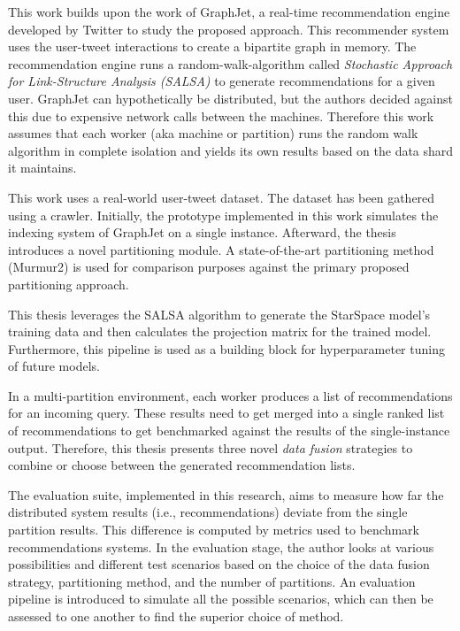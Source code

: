 This work builds upon the work of GraphJet, a real-time recommendation engine developed by Twitter to study the proposed approach. This recommender system uses the user-tweet interactions to create a bipartite graph in memory. The recommendation engine runs a random-walk-algorithm called \emph{Stochastic Approach for Link-Structure Analysis (SALSA)} to generate recommendations for a given user. GraphJet can hypothetically be distributed, but the authors decided against this due to expensive network calls between the machines. Therefore this work assumes that each worker (aka machine or partition) runs the random walk algorithm in complete isolation and yields its own results based on the data shard it maintains. 


This work uses a real-world user-tweet dataset. The dataset has been gathered using a crawler. Initially, the prototype implemented in this work simulates the indexing system of GraphJet on a single instance. Afterward, the thesis introduces a novel partitioning module. A state-of-the-art partitioning method (Murmur2) is used for comparison purposes against the primary proposed partitioning approach.


This thesis leverages the SALSA algorithm to generate the StarSpace model's training data and then calculates the projection matrix for the trained model. Furthermore, this pipeline is used as a building block for hyperparameter tuning of future models. 


In a multi-partition environment, each worker produces a list of recommendations for an incoming query. These results need to get merged into a single ranked list of recommendations to get benchmarked against the results of the single-instance output. Therefore, this thesis presents three novel \emph{data fusion} strategies to combine or choose between the generated recommendation lists.


The evaluation suite, implemented in this research, aims to measure how far the distributed system results (i.e., recommendations) deviate from the single partition results. This difference is computed by metrics used to benchmark recommendations systems. In the evaluation stage, the author looks at various possibilities and different test scenarios based on the choice of the data fusion strategy, partitioning method, and the number of partitions. An evaluation pipeline is introduced to simulate all the possible scenarios, which can then be assessed to one another to find the superior choice of method.


 